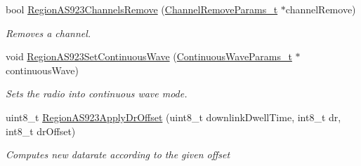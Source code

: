 \begin{DoxyCompactItemize}
bool \mbox{\hyperlink{group___r_e_g_i_o_n_a_s923_ga288bc8bbec286314166d13033979678f}{Region\+A\+S923\+Channels\+Remove}} (\mbox{\hyperlink{group___r_e_g_i_o_n_gaa37468560d2fc81a977b57a48e5d72c0}{Channel\+Remove\+Params\+\_\+t}} $\ast$channel\+Remove)
\begin{DoxyCompactList}\small\item\em Removes a channel. \end{DoxyCompactList}\item 
void \mbox{\hyperlink{group___r_e_g_i_o_n_a_s923_ga295747645e6d5ed51a52cb17cee132b4}{Region\+A\+S923\+Set\+Continuous\+Wave}} (\mbox{\hyperlink{group___r_e_g_i_o_n_gaf39bb5ba06921139c6d17f88a8d518cd}{Continuous\+Wave\+Params\+\_\+t}} $\ast$continuous\+Wave)
\begin{DoxyCompactList}\small\item\em Sets the radio into continuous wave mode. \end{DoxyCompactList}\item 
uint8\+\_\+t \mbox{\hyperlink{group___r_e_g_i_o_n_a_s923_gae3a2832d4cb1117e74dea4cdfe66998e}{Region\+A\+S923\+Apply\+Dr\+Offset}} (uint8\+\_\+t downlink\+Dwell\+Time, int8\+\_\+t dr, int8\+\_\+t dr\+Offset)
\begin{DoxyCompactList}\small\item\em Computes new datarate according to the given offset \end{DoxyCompactList}\end{DoxyCompactItemize}

